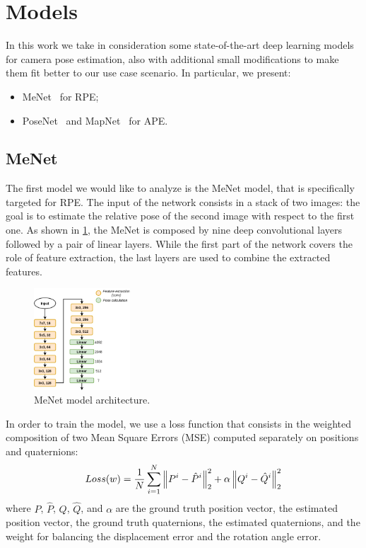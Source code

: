 \section{Models}
In this work we take in consideration some state-of-the-art deep learning models for camera pose estimation, also with additional small modifications to make them fit better to our use case scenario.
In particular, we present:
\begin{itemize}
    \item MeNet~\cite{menet} for RPE;
    \item PoseNet~\cite{9348762} and MapNet~\cite{mapnet} for APE.
\end{itemize}

\subsection{MeNet}
The first model we would like to analyze is the MeNet model, that is specifically targeted for RPE.
The input of the network consists in a stack of two images: the goal is to estimate the relative pose of the second image with respect to the first one.
As shown in \cref{fig:menet-structure}, the MeNet is composed by nine deep convolutional layers followed by a pair of linear layers. While the first part of the network covers the role of feature extraction, the last layers are used to combine the extracted features.
\begin{figure}[htbp]
    \begin{center}
        \includegraphics[width=0.32\textwidth]{./imgs/menet_structure.png}
    \end{center}
    \caption{MeNet model architecture.}
    \label{fig:menet-structure}
\end{figure}

In order to train the model, we use a loss function that consists in the weighted composition of two Mean Square Errors (MSE) computed separately on positions and quaternions:
\begin{equation}
    Loss(w) = \frac{1}{N} \sum\limits_{i=1}^N \norm{P^i - \hat{P}^i}^2_2 + \alpha\norm{Q^i - \hat{Q}^i}^2_2
    \label{eq:menet-loss}
\end{equation}
where $P$, $\hat{P}$, $Q$, $\hat{Q}$, and $\alpha$ are the ground truth position vector, the estimated position vector, the ground truth quaternions, the estimated quaternions, and the weight for balancing the displacement error and the rotation angle error.

